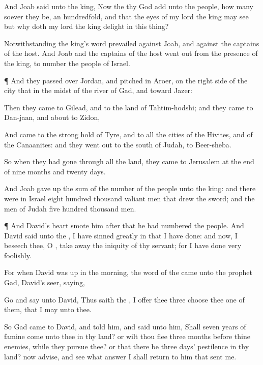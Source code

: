 {And
Joab
said unto the
king, Now the
{} thy
God
add unto the
people, how many
soever they be, an
hundredfold, and that the
eyes of my
lord the
king may
see
{} but why doth my
lord the
king
delight in this
thing?

Notwithstanding the
king’s
word
prevailed against
Joab, and against the
captains of the
host. And
Joab and the
captains of the
host went
out from the
presence of the
king, to
number the
people of
Israel.


\par }{\PP {}¶ And they passed
over
Jordan, and
pitched in
Aroer, on the right
side of the
city that
{} in the
midst of the
river of
Gad, and toward
Jazer:

Then they
came to
Gilead, and to the
land of
Tahtim-hodshi; and they
came to
Dan-jaan, and
about to
Zidon,

And
came to the strong
hold of
Tyre, and to all the
cities of the
Hivites, and of the
Canaanites: and they went
out to the
south of
Judah,
{} to
Beer-sheba.

So when they had
gone through all the
land, they
came to
Jerusalem at the
end of
nine
months and
twenty
days.

And
Joab gave
up the
sum of the
number of the
people unto the
king: and there were in
Israel
eight
hundred
thousand
valiant
men that
drew the
sword; and the
men of
Judah
{}
five
hundred
thousand
men.


\par }{\PP {}¶ And
David’s
heart
smote him
after that he had
numbered the
people. And
David
said unto the
{}, I have
sinned
greatly in that I have
done: and now, I beseech thee, O
{}, take
away the
iniquity of thy
servant; for I have done
very
foolishly.

For when
David was
up in the
morning, the
word of the
{} came unto the
prophet
Gad,
David’s
seer,
saying,

Go and
say unto
David, Thus
saith the
{}, I
offer thee
three
{}
choose thee
one of them, that I may
{} unto
thee.

So
Gad
came to
David, and
told him, and
said unto him, Shall
seven
years of
famine
come unto thee in thy
land? or wilt thou
flee
three
months
before thine
enemies, while they
pursue thee? or that there be
three
days’
pestilence in thy
land? now
advise, and
see what
answer I shall
return to him that
sent me.

}
